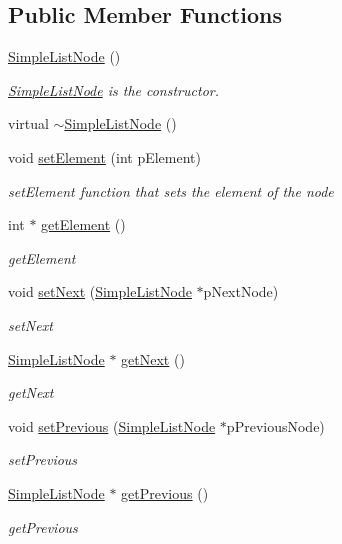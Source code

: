 \subsection*{Public Member Functions}
\begin{DoxyCompactItemize}
\item 
\hyperlink{class_simple_list_node_a984eac27531b0fd92c3614b497d7f47a}{Simple\-List\-Node} ()
\begin{DoxyCompactList}\small\item\em \hyperlink{class_simple_list_node}{Simple\-List\-Node} is the constructor. \end{DoxyCompactList}\item 
virtual \hyperlink{class_simple_list_node_a030e863eb633636a2dc70c1cdb72a5ad}{$\sim$\-Simple\-List\-Node} ()
\item 
void \hyperlink{class_simple_list_node_ad88ea222aee07a6f8b1113c92aa7b069}{set\-Element} (int p\-Element)
\begin{DoxyCompactList}\small\item\em set\-Element function that sets the element of the node \end{DoxyCompactList}\item 
int $\ast$ \hyperlink{class_simple_list_node_a79a2c3e4610352b4b24de421df8a451d}{get\-Element} ()
\begin{DoxyCompactList}\small\item\em get\-Element \end{DoxyCompactList}\item 
void \hyperlink{class_simple_list_node_af36eceb9c6e6cc0d471844d6a952f6cf}{set\-Next} (\hyperlink{class_simple_list_node}{Simple\-List\-Node} $\ast$p\-Next\-Node)
\begin{DoxyCompactList}\small\item\em set\-Next \end{DoxyCompactList}\item 
\hyperlink{class_simple_list_node}{Simple\-List\-Node} $\ast$ \hyperlink{class_simple_list_node_a2f2aaa5011673d032ac0e385dc2a4032}{get\-Next} ()
\begin{DoxyCompactList}\small\item\em get\-Next \end{DoxyCompactList}\item 
void \hyperlink{class_simple_list_node_acebffab49dae4768f695054b0ccff68a}{set\-Previous} (\hyperlink{class_simple_list_node}{Simple\-List\-Node} $\ast$p\-Previous\-Node)
\begin{DoxyCompactList}\small\item\em set\-Previous \end{DoxyCompactList}\item 
\hyperlink{class_simple_list_node}{Simple\-List\-Node} $\ast$ \hyperlink{class_simple_list_node_ac4bead7a1bd4e896f8a8e7a8a53cbc3d}{get\-Previous} ()
\begin{DoxyCompactList}\small\item\em get\-Previous \end{DoxyCompactList}\end{DoxyCompactItemize}
